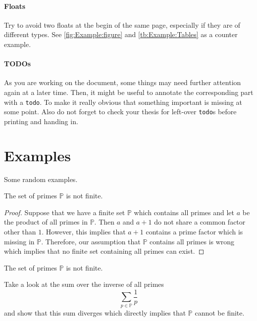 \paragraph{Floats}
Try to avoid two floats at the begin of the same page, especially if they are of different types.
See \cref{fig:Example:figure} and \cref{tb:Example:Tables} as a counter example.

\paragraph{TODOs}
As you are working on the document, some things may need further
attention again at a later time.  Then, it might be useful to annotate
the corresponding part with a \texttt{todo}.  To make it really
obvious that something important is missing at some
point. 
Also do not forget to check your thesis for left-over \texttt{todo}s
before printing and handing in.


\section{Examples}
Some random examples.
\begin{theorem}
	The set of primes $\mathbb{P}$ is not finite.
	\label{thm:Example:Examples:euclid}
\end{theorem}
\begin{proof}
	Suppose that we have a finite set $\mathbb{P}$ which contains all primes and let $a$ be the product of all primes in $\mathbb{P}$.
	Then $a$ and $a+1$ do not share a common factor other than $1$.
	However, this implies that $a+1$ contains a prime factor which is missing in $\mathbb{P}$.
	Therefore, our assumption that $\mathbb{P}$ contains all primes is wrong which implies that no finite set containing all primes can exist.
\end{proof}

\begin{theorem}
	The set of primes $\mathbb{P}$ is not finite.
\end{theorem}
\begin{proofSketch}
	Take a look at the sum over the inverse of all primes
	\[\sum_{p\in\mathbb{P}} \frac{1}{p}\]
	and show that this sum diverges which directly implies that $\mathbb{P}$ cannot be finite.
\end{proofSketch}

